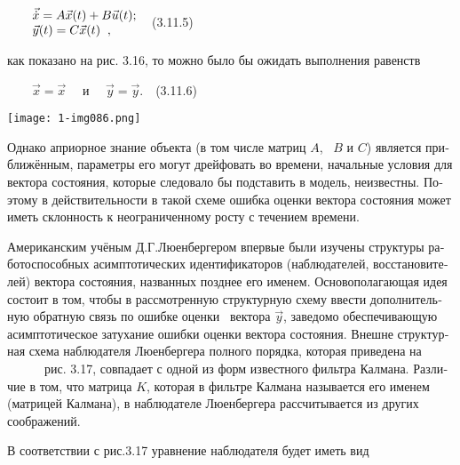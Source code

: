 \documentclass[a4paper]{article}
\begin{document}
{\begin{russian}\sffamily
\ \ \ \  $\begin{matrix}\vec{\dot x}=A\vec x(t)+B\vec u(t);\hfill\null \\\vec y(t)=C\vec x(t)\;\;,\hfill\null
\end{matrix}\hfill $\ \ (3.11.5)
\end{russian}}

{\begin{russian}\sffamily
как показано на рис. 3.16, то можно было бы ожидать выполнения равенств
\end{russian}}

{\begin{russian}\sffamily
\ \ \ \  $\vec x=\vec x$ \ \ и \ \  $\vec y=\vec y$.\textenglish{\ \ }(3.11.6)
\end{russian}}


\bigskip

{\centering  \texttt{[image: 1-img086.png]} \par}
{\begin{russian}\sffamily
Однако априорное знание объекта (в том числе матриц  $A$, \  $B$ и  $C$) является приближённым, параметры его могут
дрейфовать во времени, начальные условия для вектора состояния, которые следовало бы подставить в модель, неизвестны.
Поэтому в действительности в такой схеме ошибка оценки вектора состояния может иметь склонность к неограниченному росту
с течением времени.
\end{russian}}

{\begin{russian}\sffamily
Американским учёным Д.Г.Люенбергером впервые были изучены структуры работоспособных асимптотических идентификаторов
(наблюдателей, восстановителей) вектора состояния, названных позднее его именем. Основополагающая идея состоит в том,
чтобы в рассмотренную структурную схему ввести дополнительную обратную связь по ошибке оценки \ вектора  $\vec y$,
заведомо обеспечивающую асимптотическое затухание ошибки оценки вектора состояния. Внешне структурная схема наблюдателя
Люенбергера полного порядка, которая приведена на \ \ \ \ \ \ рис. 3.17, совпадает с одной из форм известного фильтра
Калмана. Различие в том, что матрица  $K$, которая в фильтре Калмана называется его именем (матрицей Калмана), в
наблюдателе Люенбергера рассчитывается из других соображений. 
\end{russian}}

{\begin{russian}\sffamily
В соответствии с рис.3.17 уравнение наблюдателя будет иметь вид
\end{russian}}
\end{document}
